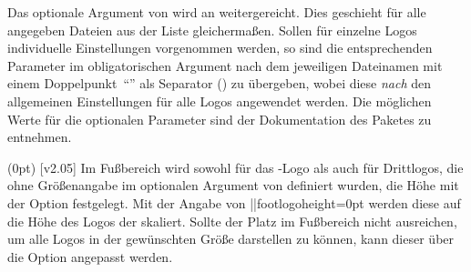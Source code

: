\begin{DeclareEntity*}{}
\begin{DeclareEntity*}{}
\begin{DeclareEntity*}{}
\begin{Declaration}
\begin{Declaration}
Das optionale Argument von  wird an  
weitergereicht. Dies geschieht für alle angegeben Dateien aus der Liste 
gleichermaßen. Sollen für einzelne Logos individuelle Einstellungen vorgenommen 
werden, so sind die entsprechenden Parameter im obligatorischen Argument nach 
dem jeweiligen Dateinamen mit einem Doppelpunkt~\enquote{\PValue{:}} als 
Separator () zu 
übergeben, wobei diese \emph{nach} den allgemeinen Einstellungen für alle Logos 
angewendet werden. Die möglichen Werte für die optionalen Parameter sind der 
Dokumentation des Paketes  zu entnehmen.
\end{Declaration}
\end{Declaration}

\begin{Declaration}
  {}
  (0pt)
  [v2.05]
%
Im Fußbereich wird sowohl für das \DDC-Logo als auch für Drittlogos, die ohne 
Größenangabe im optionalen Argument von  definiert wurden, die 
Höhe mit der Option  festgelegt. Mit der Angabe 
von \Option||{footlogoheight=0pt} werden diese auf die Höhe des Logos der 
\TnUD skaliert. Sollte der Platz im Fußbereich nicht ausreichen, um alle Logos 
in der gewünschten Größe darstellen zu können, kann dieser über die Option
 angepasst werden.
\end{Declaration}


\end{DeclareEntity*}
\end{DeclareEntity*}
\end{DeclareEntity*}
